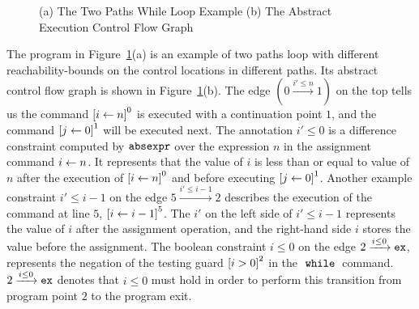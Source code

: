 \begin{example}
{\begin{figure}
\begin{subfigure}{.5\textwidth}
\begin{centering}
\begin{tikzpicture}[scale=\textwidth/20cm,samples=200]
  \end{tikzpicture}
  \caption{}
    \end{centering}
    \end{subfigure}
  \caption{
  (a) The Two Paths While Loop Example
    (b) The Abstract Execution Control Flow Graph}
      \label{fig:twoPathsWhile_abscfg}
  \end{figure}
  }
The program in Figure~\ref{fig:twoPathsWhile_abscfg}(a) is an example of two paths loop with different reachability-bounds on the control
locations in different paths.
Its abstract control flow graph is shown in Figure~\ref{fig:twoPathsWhile_abscfg}(b).
The edge $(0 \xrightarrow{i' \leq n} 1)$ on the top tells us the command 
$\clabel{\assign{i}{n}}^0$ is executed with a continuation point $1$, and the
command $\clabel{\assign{j}{0}}^1$ will be executed next.
The annotation $i' \leq 0$ is a difference constraint 
computed by $\absexpr$ over
the expression $n$ in the assignment command $\assign{i}{n}$.
It represents that the value of $i$ is less than or equal to value of $n$ after the
execution of $\clabel{\assign{i}{n}}^0$ and before executing $\clabel{\assign{j}{0}}^1$.
Another example constraint $i' \leq i - 1$ on the edge $5 \xrightarrow{i' \leq i - 1} 2$
describes the execution of
 the command at line $5$, 
$\clabel{\assign{i}{i - 1}}^{5}$. 
The $i'$ on the left side of $i' \leq i - 1$ represents the value of $i$ after the assignment operation,
and the right-hand side $i$ stores the value before the assignment.
The boolean constraint $i \leq 0 $ on the edge $2 \xrightarrow{i \leq 0} \lex$, 
represents the negation of the testing guard $\clabel{i > 0}^2$
in the $\ewhile$ command.
$2 \xrightarrow{i \leq 0} \lex$ denotes that $i \leq 0$ must hold in order to perform this transition from program point $2$ to
the program exit. 
\end{example}